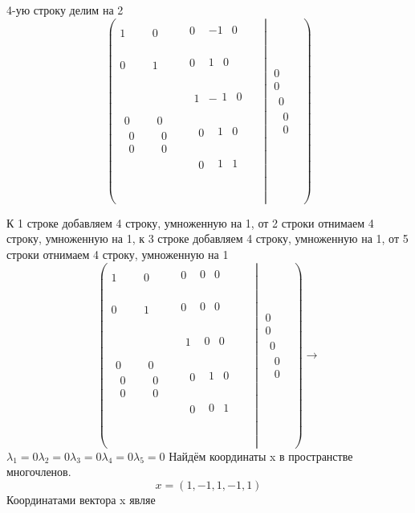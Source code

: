 \documentclass{article}
\begin{document}
4-ую строку делим на 2$$
  \left(\begin{matrix}1&0&\begin{matrix}0&\begin{matrix}-1&0\\\end{matrix}\\\end{matrix}\\0&1&\begin{matrix}0&\begin{matrix}1&0\\\end{matrix}\\\end{matrix}\\\begin{matrix}0\\\begin{matrix}0\\0\\\end{matrix}\\\end{matrix}&\begin{matrix}0\\\begin{matrix}0\\0\\\end{matrix}\\\end{matrix}&\begin{matrix}\begin{matrix}1&-\begin{matrix}1&0\\\end{matrix}\\\end{matrix}\\\begin{matrix}\begin{matrix}0&\begin{matrix}1&0\\\end{matrix}\\\end{matrix}\\\begin{matrix}0&\begin{matrix}1&1\\\end{matrix}\\\end{matrix}\\\end{matrix}\\\end{matrix}\\\end{matrix}\middle|\begin{matrix}0\\0\\\begin{matrix}0\\\begin{matrix}0\\0\\\end{matrix}\\\end{matrix}\\\end{matrix}\right)$$


К 1 строке добавляем 4 строку, умноженную на 1, от 2 строки отнимаем 4 строку, умноженную на 1, к 3 строке добавляем 4 строку, умноженную на 1, от 5 строки отнимаем 4 строку, умноженную на 1$$
  \left(\begin{matrix}1&0&\begin{matrix}0&\begin{matrix}0&0\\\end{matrix}\\\end{matrix}\\0&1&\begin{matrix}0&\begin{matrix}0&0\\\end{matrix}\\\end{matrix}\\\begin{matrix}0\\\begin{matrix}0\\0\\\end{matrix}\\\end{matrix}&\begin{matrix}0\\\begin{matrix}0\\0\\\end{matrix}\\\end{matrix}&\begin{matrix}\begin{matrix}1&\begin{matrix}0&0\\\end{matrix}\\\end{matrix}\\\begin{matrix}\begin{matrix}0&\begin{matrix}1&0\\\end{matrix}\\\end{matrix}\\\begin{matrix}0&\begin{matrix}0&1\\\end{matrix}\\\end{matrix}\\\end{matrix}\\\end{matrix}\\\end{matrix}\middle|\begin{matrix}0\\0\\\begin{matrix}0\\\begin{matrix}0\\0\\\end{matrix}\\\end{matrix}\\\end{matrix}\right)\rightarrow $$ $\lambda_1=0\lambda_2=0\lambda_3=0\lambda_4=0\lambda_5=0$
Найдём координаты x в пространстве многочленов.
$$x=(1,-1,1,-1,1)$$
Координатами вектора x являе
\end{document}
